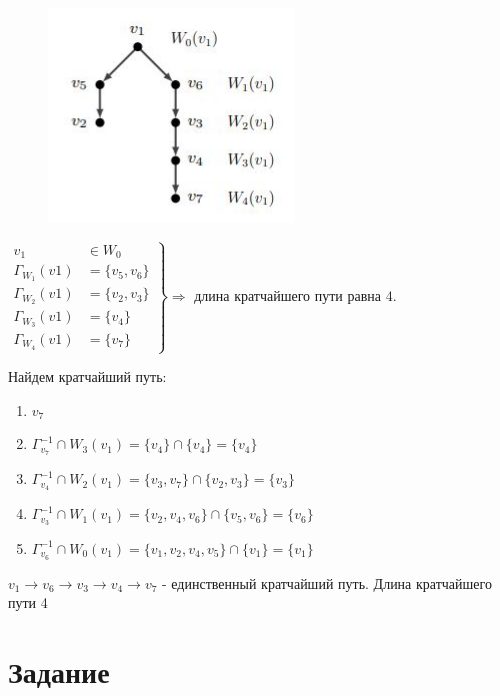 \documentclass[a4paper, 12pt]{article}
\newcommand{\RNum}[1]{\uppercase\expandafter{\romannumeral #1\relax}}
\begin{document}
\begin{figure}[h]
    \includegraphics{3_graph}
\end{figure}

$ \left. 
\begin{aligned}
    v_1 &\in W_0 \\ 
    \Gamma _{W_1}(v1) &= \{v_5, v_6\} \\
    \Gamma _{W_2}(v1) &= \{v_2, v_3\} \\
    \Gamma _{W_3}(v1) &= \{v_4\} \\
    \Gamma _{W_4}(v1) &= \{v_7\}
\end{aligned}
\right\} \Rightarrow $ длина кратчайшего пути равна $4$.

\noindent Найдем кратчайший путь:
\begin{enumerate} %
    \item $v_7$
    \item $ \Gamma_{v_7}^{-1} \cap W_3(v_1) = \{v_4\} \cap \{v_4\} = \{v_4\}$
    \item $ \Gamma_{v_4}^{-1} \cap W_2(v_1) = \{v_3, v_7\} \cap \{v_2, v_3\} = \{v_3\}$
    \item $ \Gamma_{v_3}^{-1} \cap W_1(v_1) = \{v_2, v_4, v_6\} \cap \{v_5, v_6\} = \{v_6\}$
    \item $ \Gamma_{v_6}^{-1} \cap W_0(v_1) = \{v_1, v_2, v_4, v_5\} \cap \{v_1\} = \{v_1\}$
\end{enumerate}
$ v_1 \rightarrow v_6 \rightarrow v_3 \rightarrow v_4 \rightarrow v_7$ - единственный кратчайший путь. Длина кратчайшего пути 4

\section{Задание \RNum{4}} 
\end{document}
